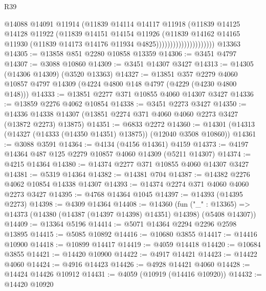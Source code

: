 \begin{lexlean}{R39}
\begin{coremodule}
                                    @14088
                                    @14091
                                    @11914
                                    (@11839
                                      @14114
                                      @14117
                                      @11918
                                      (@11839
                                        @14125
                                        @14128
                                        @11922
                                        (@11839
                                          @14151
                                          @14154
                                          @11926
                                          (@11839
                                            @14162
                                            @14165
                                            @11930
                                            (@11839 @14173 @14176 @11934 @4825)))))))))))))))))))))
    @13363
@14305 := @13858 @851 @2280 @10858 @13359
@14306 := @3451 @4797
@14307 := @3088 @10860
@14309 := @3451 @14307 @3427
@14313 := @14305 (@14306 @14309) (@3520 @13363)
@14327 := @13851
    @357
    @2279
    @4060
    @10857
    @4797
    @14309
    (@4224 @4800 @148 @4797 (@4229 (@4230 @4800 @148)))
@14333 := @13851 @2277 @371 @10855 @4060 @14307 @3427
@14336 := @13859 @2276 @4062 @10854
@14338 := @3451 @2273 @3427
@14350 := @14336 @14338 @14307 (@13851 @2274 @371 @4060 @4060 @2273 @3427 (@13872 @2273) @13875)
@14351 := @6833 @2272
@14360 := @14301 (@14313 (@14327 (@14333 (@14350 @14351) @13875)) (@12040 @3508 @10860))
@14361 := @3088 @3591
@14364 := @4134 (@4156 @14361) @4159
@14373 := @4197 @14364 @487 @125 @2279 @10857 @4060 @14309 (@5211 @14307)
@14374 := @4215 @14364
@14380 := @14374 @2277 @371 @10855 @4060 @14307 @3427
@14381 := @5319 @14364
@14382 := @14381 @704
@14387 := @14382 @2276 @4062 @10854 @14338 @14307
@14393 := @14374 @2274 @371 @4060 @4060 @2273 @3427
@14395 := @4768 @14364 @1045
@14397 := @14393 (@14395 @2273)
@14398 := @4309 @14364
@14408 := @14360
    (fun ("_" : @13365) => @14373 (@14380 (@14387 (@14397 @14398) @14351) @14398) (@5408 @14307))
@14409 := @13364 @5196
@14414 := @5071 @14364 @2294 @2296 @2598 @13895
@14415 := @5085 @10892
@14416 := @10680 @3855
@14417 := @14416 @10900
@14418 := @10899 @14417
@14419 := @4059 @14418
@14420 := @10684 @3855
@14421 := @14420 @10900
@14422 := @4917 @14421
@14423 := @14422 @4060
@14424 := @4916 @14423
@14426 := @4928 @14421 @4060
@14428 := @14424 @14426 @10912
@14431 := @4059 (@10919 (@14416 @10920))
@14432 := @14420 @10920

\end{coremodule}
\end{lexlean}
